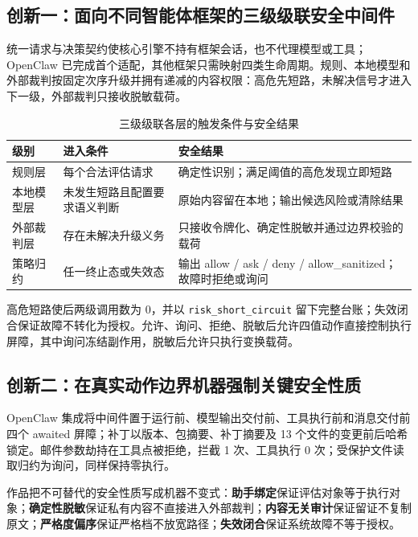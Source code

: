 \subsection{创新一：面向不同智能体框架的三级级联安全中间件}

统一请求与决策契约使核心引擎不持有框架会话，也不代理模型或工具；OpenClaw 已完成首个适配，其他框架只需映射四类生命周期。规则、本地模型和外部裁判按固定次序升级并拥有递减的内容权限：高危先短路，未解决信号才进入下一级，外部裁判只接收脱敏载荷。

\begin{table}[htbp]
\centering
\caption{三级级联各层的触发条件与安全结果}
\label{tab:innovation-cascade}
\small
\begin{tabular}{@{}lp{4.6cm}p{5.3cm}@{}}
\toprule
级别 & 进入条件 & 安全结果 \\
\midrule
规则层 & 每个合法评估请求 & 确定性识别；满足阈值的高危发现立即短路 \\
本地模型层 & 未发生短路且配置要求语义判断 & 原始内容留在本地；输出候选风险或清除结果 \\
外部裁判层 & 存在未解决升级义务 & 只接收令牌化、确定性脱敏并通过边界校验的载荷 \\
策略归约 & 任一终止态或失效态 & 输出 allow / ask / deny / allow\_sanitized；故障时拒绝或询问 \\
\bottomrule
\end{tabular}
\end{table}

高危短路使后两级调用数为 0，并以 \verb|risk_short_circuit| 留下完整台账；失效闭合保证故障不转化为授权。允许、询问、拒绝、脱敏后允许四值动作直接控制执行屏障，其中询问冻结副作用，脱敏后允许只执行变换载荷。

\subsection{创新二：在真实动作边界机器强制关键安全性质}

OpenClaw 集成将中间件置于运行前、模型输出交付前、工具执行前和消息交付前四个 awaited 屏障；补丁以版本、包摘要、补丁摘要及 13 个文件的变更前后哈希锁定。邮件参数劫持在工具点被拒绝，拦截 1 次、工具执行 0 次；受保护文件读取归约为询问，同样保持零执行。

作品把不可替代的安全性质写成机器不变式：\textbf{助手绑定}保证评估对象等于执行对象；\textbf{确定性脱敏}保证私有内容不直接进入外部裁判；\textbf{内容无关审计}保证留证不复制原文；\textbf{严格度偏序}保证严格档不放宽路径\cite{progent2025,contracts2026}；\textbf{失效闭合}保证系统故障不等于授权。

